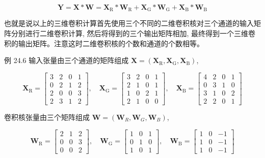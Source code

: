 \documentclass[10pt]{article}
\begin{document}
\begin{equation*}
\boldsymbol{Y}=\boldsymbol{X} * \boldsymbol{W}=\boldsymbol{X}_{\mathrm{R}} * \boldsymbol{W}_{\mathrm{R}}+\boldsymbol{X}_{\mathrm{G}} * \boldsymbol{W}_{\mathrm{G}}+\boldsymbol{X}_{\mathrm{B}} * \boldsymbol{W}_{\mathrm{B}} \tag{24.7}
\end{equation*}


也就是说以上的三维卷积计算首先使用三个不同的二维卷积核对三个通道的输入矩阵分别进行二维卷积计算, 然后将得到的三个输出矩阵相加, 最终得到一个三维卷积的输出矩阵。注意这时二维卷积核的个数和通道的个数相等。

例 24.6 输入张量由三个通道的矩阵组成 $\boldsymbol{X}=\left(\boldsymbol{X}_{\mathrm{R}}, \boldsymbol{X}_{\mathrm{G}}, \boldsymbol{X}_{\mathrm{B}}\right)$,

$$
\boldsymbol{X}_{\mathrm{R}}=\left[\begin{array}{cccc}
3 & 2 & 0 & 1 \\
0 & 2 & 1 & 2 \\
2 & 0 & 0 & 3 \\
2 & 3 & 1 & 2
\end{array}\right], \quad \boldsymbol{X}_{\mathrm{G}}=\left[\begin{array}{cccc}
3 & 2 & 0 & 1 \\
2 & 1 & 0 & 1 \\
1 & 0 & 2 & 1 \\
2 & 1 & 0 & 0
\end{array}\right], \quad \boldsymbol{X}_{\mathrm{B}}=\left[\begin{array}{cccc}
4 & 2 & 0 & 1 \\
0 & 3 & 1 & 0 \\
3 & 1 & 0 & 2 \\
2 & 2 & 0 & 1
\end{array}\right]
$$

卷积核张量由三个矩阵组成 $\boldsymbol{W}=\left(\boldsymbol{W}_{R}, \boldsymbol{W}_{G}, \boldsymbol{W}_{B}\right)$,

$$
\boldsymbol{W}_{\mathrm{R}}=\left[\begin{array}{ccc}
2 & 1 & 2 \\
0 & 0 & 3 \\
0 & 0 & 2
\end{array}\right], \quad \boldsymbol{W}_{\mathrm{G}}=\left[\begin{array}{ccc}
1 & 0 & 1 \\
0 & 1 & 0 \\
1 & 0 & 1
\end{array}\right], \quad \boldsymbol{W}_{\mathrm{B}}=\left[\begin{array}{ccc}
1 & 0 & -1 \\
1 & 0 & -1 \\
1 & 0 & -1
\end{array}\right]
$$
\end{document}
